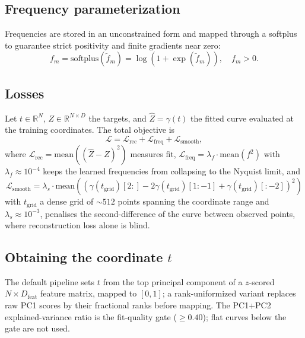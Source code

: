 \documentclass[11pt,a4paper]{article}
\begin{document}
\subsection{Frequency parameterization}
Frequencies are stored in an unconstrained form and mapped through a softplus to guarantee strict positivity and finite gradients near zero:
\begin{equation}
f_{m} = \mathrm{softplus}(\tilde{f}_{m}) = \log(1 + \exp(\tilde{f}_{m})), \quad f_{m} > 0.
\label{eq:freq}
\end{equation}

\subsection{Losses}
Let $t \in \mathbb{R}^{N}$, $Z \in \mathbb{R}^{N \times D}$ the targets, and $\hat{Z} = \gamma(t)$ the fitted curve evaluated at the training coordinates. The total objective is
\begin{equation}
\mathcal{L} = \mathcal{L}_{\mathrm{rec}} + \mathcal{L}_{\mathrm{freq}} + \mathcal{L}_{\mathrm{smooth}},
\label{eq:loss}
\end{equation}
where $\mathcal{L}_{\mathrm{rec}} = \mathrm{mean}((\hat{Z} - Z)^{2})$ measures fit, $\mathcal{L}_{\mathrm{freq}} = \lambda_{f} \cdot \mathrm{mean}(f^{2})$ with $\lambda_{f} \approx 10^{-4}$ keeps the learned frequencies from collapsing to the Nyquist limit, and
\begin{equation}
\mathcal{L}_{\mathrm{smooth}} = \lambda_{s} \cdot \mathrm{mean}((\gamma(t_{\mathrm{grid}})[2:] - 2\gamma(t_{\mathrm{grid}})[1:-1] + \gamma(t_{\mathrm{grid}})[:-2])^{2})
\label{eq:smooth}
\end{equation}
with $t_{\mathrm{grid}}$ a dense grid of $\sim 512$ points spanning the coordinate range and $\lambda_{s} \approx 10^{-3}$, penalises the second-difference of the curve between observed points, where reconstruction loss alone is blind.

\subsection{Obtaining the coordinate $t$}
The default pipeline sets $t$ from the top principal component of a $z$-scored $N \times D_{\mathrm{feat}}$ feature matrix, mapped to $[0,1]$; a rank-uniformized variant replaces raw PC1 scores by their fractional ranks before mapping. The PC1+PC2 explained-variance ratio is the fit-quality gate ($\geq 0.40$); flat curves below the gate are not used.
\end{document}
